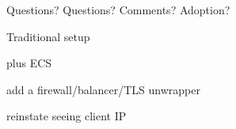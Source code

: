 \documentclass{beamer}
\begin{document}
\begin{frame}{Questions?}
Questions? Comments? Adoption?

\end{frame}

\begin{frame}{Traditional setup}
\end{frame}

\begin{frame}{plus ECS}
\end{frame}

\begin{frame}{add a firewall/balancer/TLS unwrapper}
\end{frame}

\begin{frame}{reinstate seeing client IP}
\end{frame}
\end{document}
